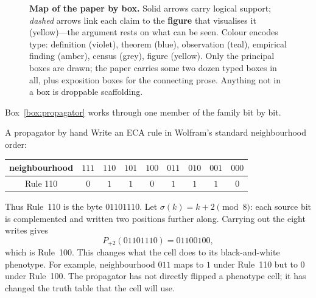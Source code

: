\documentclass[man,12pt,floatsintext]{apa7}
\newcommand{\sig}{\sigma}
\begin{document}
\begin{figure}[!tp]
\caption{\textbf{Map of the paper by box.} Solid arrows carry logical support;
\emph{dashed} arrows link each claim to the \textbf{figure} that visualises it
(yellow)---the argument rests on what can be seen. Colour encodes type:
definition (violet), theorem (blue), observation (teal), empirical finding
(amber), census (grey), figure (yellow). Only the principal boxes are drawn; the
paper carries some two dozen typed boxes in all, plus exposition boxes for the
connecting prose. Anything not in a box is droppable scaffolding.}
\label{fig:map}
\end{figure}

Box~\ref{box:propagator} works through one member of the
family bit by bit.

\begin{workedexample}[label={box:propagator}]{A propagator by hand}
\small
Write an ECA rule in Wolfram's standard neighbourhood order:
\begin{center}
\setlength{\tabcolsep}{3.2pt}
\begin{tabular}{c@{\quad}*{8}{c}}
neighbourhood & $111$ & $110$ & $101$ & $100$ & $011$ & $010$ & $001$ & $000$ \\
\midrule
Rule 110 & $0$ & $1$ & $1$ & $0$ & $1$ & $1$ & $1$ & $0$ \\
\end{tabular}
\end{center}
Thus Rule~110 is the byte $01101110$. Let $\sig(k)=k+2\pmod 8$:
each source bit is complemented and written two positions further along.
Carrying out the eight writes gives
\[
P_{+2}(01101110)=01100100,
\]
which is Rule~100. This changes what the cell does to its black-and-white
phenotype. For example, neighbourhood $011$ maps to $1$ under Rule~110 but
to $0$ under Rule~100. The propagator has not directly flipped a phenotype
cell; it has changed the truth table that the cell will use.
\end{workedexample}
\end{document}

